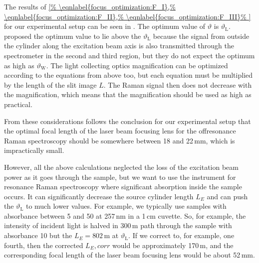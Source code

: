 \begin{figure}
	\centering
	
	\caption[%
		A plot of the fractional Raman flux $F$.%
	]{%
	}
	\label{\figlabel{focus_optimization:F}}
\end{figure}

The results of \cref{%
	\eqnlabel{focus_optimization:F_I},%
	\eqnlabel{focus_optimization:F_II},%
	\eqnlabel{focus_optimization:F_III}%
}
for our experimental setup can be seen in
.
The optimum value of $\vartheta$ is $\vartheta_\text{L}$.
\textcite{Barrett1968}
proposed the optimum value to lie above the $\vartheta_\text{L}$ because the
signal from outside the cylinder along the excitation beam axis is also
transmitted through the spectrometer in the second and third region, but they
do not expect the optimum as high as $\vartheta_\text{W}$.
The light collecting optics magnification can be optimized according to the
equations from above too, but each equation must be multiplied by the length of
the slit image $L$.
The Raman signal then does not decrease with the magnification, which means
that the magnification should be used as high as practical.

From these considerations follows the conclusion for our experimental setup
that the optimal focal length of the laser beam focusing lens for the
offresonance Raman spectroscopy should be somewhere between 18 and 22\,mm,
which is impractically small.

However, all the above calculations neglected the loss of the excitation beam
power as it goes through the sample, but we want to use the instrument for
resonance Raman spectroscopy where significant absorption inside the sample
occurs.
It can significantly decrease the source cylinder length $L_E$ and can push the
$\vartheta_\text{L}$ to much lower values.
For example, we typically use samples with absorbance between 5 and 50 at
257\,nm in a 1\,cm cuvette.
So, for example, the intensity of incident light is halved in 300\,m path
through the sample with absorbance 10 but the $L_E = 802$\,m at
$\vartheta_\text{L}$.
If we correct
to, for example, one fourth, then the
corrected $L_E,corr$ would be approximately 170\,m, and the corresponding
focal length of the laser beam focusing lens would be about 52\,mm.

